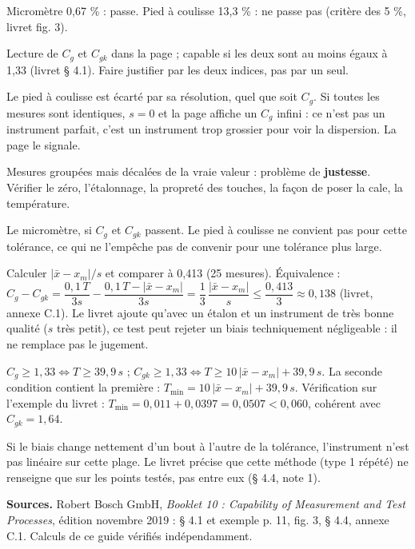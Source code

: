 \documentclass[10pt,a4paper]{article}
\begin{document}
\begin{description}[leftmargin=0pt,style=nextline,itemsep=3pt]
\item[Q1 (fiche stagiaire p. 2)] Micromètre 0,67 \% : passe. Pied à coulisse 13,3 \% : ne passe pas (critère des 5 \%, livret fig. 3).
\item[Q2 (p. 2)] Lecture de $C_g$ et $C_{gk}$ dans la page ; capable si les deux sont au moins égaux à 1,33 (livret § 4.1). Faire justifier par les deux indices, pas par un seul.
\item[Q3 (p. 2)] Le pied à coulisse est écarté par sa résolution, quel que soit $C_g$. Si toutes les mesures sont identiques, $s = 0$ et la page affiche un $C_g$ infini : ce n'est pas un instrument parfait, c'est un instrument trop grossier pour voir la dispersion. La page le signale.
\item[Q4 (p. 2)] Mesures groupées mais décalées de la vraie valeur : problème de \textbf{justesse}. Vérifier le zéro, l'étalonnage, la propreté des touches, la façon de poser la cale, la température.
\item[Q5 (p. 2)] Le micromètre, si $C_g$ et $C_{gk}$ passent. Le pied à coulisse ne convient pas pour cette tolérance, ce qui ne l'empêche pas de convenir pour une tolérance plus large.
\item[Défi a (p. 2)] Calculer $\lvert\bar x - x_m\rvert / s$ et comparer à 0,413 (25 mesures). Équivalence :
$C_g - C_{gk} = \dfrac{0{,}1\,T}{3s} - \dfrac{0{,}1\,T - \lvert\bar x - x_m\rvert}{3s} = \dfrac{1}{3}\,\dfrac{\lvert\bar x - x_m\rvert}{s} \le \dfrac{0{,}413}{3} \approx 0{,}138$ (livret, annexe C.1).
Le livret ajoute qu'avec un étalon et un instrument de très bonne qualité ($s$ très petit), ce test peut rejeter un biais techniquement négligeable : il ne remplace pas le jugement.
\item[Défi b (p. 2)] $C_g \ge 1{,}33 \iff T \ge 39{,}9\,s$ ; $C_{gk} \ge 1{,}33 \iff T \ge 10\,\lvert\bar x - x_m\rvert + 39{,}9\,s$. La seconde condition contient la première :
$T_{\min} = 10\,\lvert\bar x - x_m\rvert + 39{,}9\,s$. Vérification sur l'exemple du livret : $T_{\min} = 0{,}011 + 0{,}0397 = 0{,}0507 < 0{,}060$, cohérent avec $C_{gk} = 1{,}64$.
\item[Défi c (p. 2)] Si le biais change nettement d'un bout à l'autre de la tolérance, l'instrument n'est pas linéaire sur cette plage. Le livret précise que cette méthode (type 1 répété) ne renseigne que sur les points testés, pas entre eux (§ 4.4, note 1).
\end{description}

\vfill
{\footnotesize\color{uimm}\textbf{Sources.} Robert Bosch GmbH, \emph{Booklet 10 : Capability of Measurement and Test Processes}, édition novembre 2019 : § 4.1 et exemple p. 11, fig. 3, § 4.4, annexe C.1. Calculs de ce guide vérifiés indépendamment.}
\end{document}
